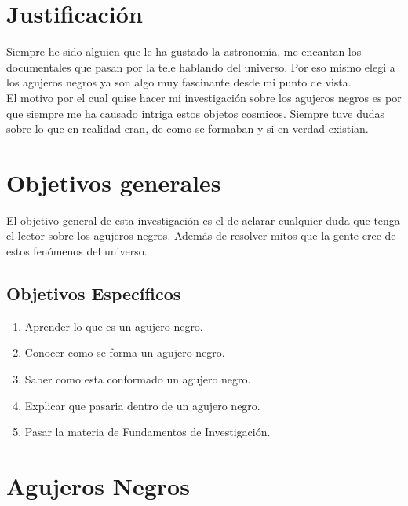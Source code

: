 \documentclass[12pt]{article}
\begin{document}
\section{Justificación}
Siempre he sido alguien que le ha gustado la astronomía, me encantan los documentales que pasan por la tele hablando del universo. Por eso mismo elegi a los agujeros negros ya son algo muy fascinante desde mi punto de vista.\\
El motivo por el cual quise hacer mi investigación sobre los agujeros negros es por que siempre me ha causado intriga estos objetos cosmicos. Siempre tuve dudas sobre lo que en realidad eran, de como se formaban y si en verdad existian.\\

\newpage

\section{Objetivos generales}
El objetivo general de esta investigación es el de aclarar cualquier duda que tenga el lector sobre los agujeros negros. Además de resolver mitos que la gente cree de estos fenómenos del universo.
\subsection{Objetivos Específicos}
\begin{enumerate}
	\item Aprender lo que es un agujero negro.
	\item Conocer como se forma un agujero negro.
	\item Saber como esta conformado un agujero negro.
	\item Explicar que pasaria dentro de un agujero negro.
	\item Pasar la materia de Fundamentos de Investigación.
\end{enumerate}
\newpage

\section{Agujeros Negros}
\end{document}

